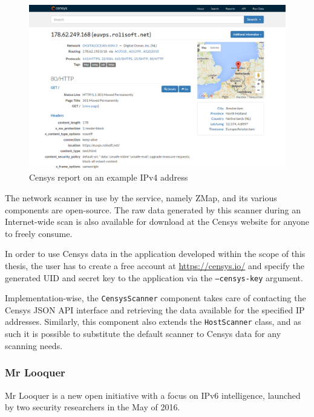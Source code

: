 \documentclass[a4paper,12pt]{article}
\begin{document}
	\begin{figure}[!htbp]
		\centering
		\includegraphics[scale=0.355]{censys.png}
		\caption{Censys report on an example IPv4 address}
		\label{censysscr}
	\end{figure}
	
	The network scanner in use by the service, namely ZMap\cite{zmap13}, and its various components are open-source. The raw data generated by this scanner during an Internet-wide scan is also available for download at the Censys website for anyone to freely consume.
	
	In order to use Censys data in the application developed within the scope of this thesis, the user has to create a free account at \url{https://censys.io/} and specify the generated UID and secret key to the application via the \texttt{--censys-key} argument.
		
	Implementation-wise, the \texttt{CensysScanner} component takes care of contacting the Censys JSON API interface and retrieving the data available for the specified IP addresses. Similarly, this component also extends the \texttt{HostScanner} class, and as such it is possible to substitute the default scanner to Censys data for any scanning needs.
	
\subsubsection{Mr Looquer} \label{looquer}
 

	Mr Looquer\cite{looquer16} is a new open initiative with a focus on IPv6 intelligence, launched by two security researchers in the May of 2016.
	
\end{document}
